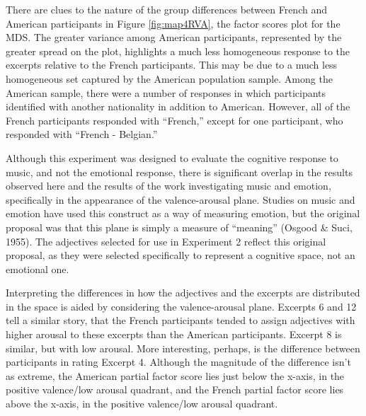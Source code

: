\documentclass[
  english,
  man,floatsintext]{apa6}
\begin{document}
There are clues to the nature of the group differences between French and American participants in Figure \ref{fig:map4RVA}, the factor scores plot for the MDS. The greater variance among American participants, represented by the greater spread on the plot, highlights a much less homogeneous response to the excerpts relative to the French participants. This may be due to a much less homogeneous set captured by the American population sample. Among the American sample, there were a number of responses in which participants identified with another nationality in addition to American. However, all of the French participants responded with ``French,'' except for one participant, who responded with ``French - Belgian.''

Although this experiment was designed to evaluate the cognitive response to music, and not the emotional response, there is significant overlap in the results observed here and the results of the work investigating music and emotion, specifically in the appearance of the valence-arousal plane. Studies on music and emotion have used this construct as a way of measuring emotion, but the original proposal was that this plane is simply a measure of ``meaning'' (Osgood \& Suci, 1955). The adjectives selected for use in Experiment 2 reflect this original proposal, as they were selected specifically to represent a cognitive space, not an emotional one.

Interpreting the differences in how the adjectives and the excerpts are distributed in the space is aided by considering the valence-arousal plane. Excerpts 6 and 12 tell a similar story, that the French participants tended to assign adjectives with higher arousal to these excerpts than the American participants. Excerpt 8 is similar, but with low arousal. More interesting, perhaps, is the difference between participants in rating Excerpt 4. Although the magnitude of the difference isn't as extreme, the American partial factor score lies just below the x-axis, in the positive valence/low arousal quadrant, and the French partial factor score lies above the x-axis, in the positive valence/low arousal quadrant.
\end{document}
